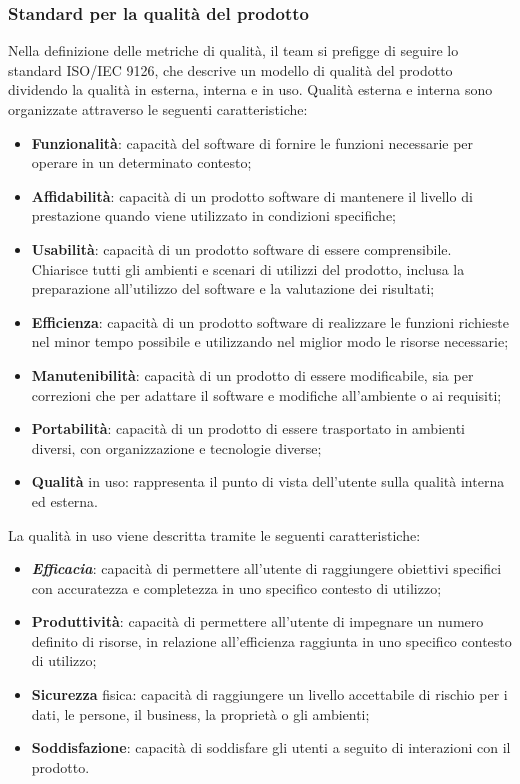 \documentclass[10pt, a4paper]{article}
\begin{document}
\subsubsection{Standard per la qualità del prodotto}
Nella definizione delle metriche di qualità, il team si prefigge di seguire lo standard ISO/IEC 9126, che descrive un modello di qualità del prodotto
dividendo la qualità in esterna, interna e in uso.
Qualità esterna e interna sono organizzate attraverso le seguenti caratteristiche:
\begin{itemize}
    \item \textbf{Funzionalità}: capacità del software di fornire le funzioni necessarie per operare in un determinato contesto;
    \item \textbf{Affidabilità}: capacità di un prodotto software di mantenere il livello di prestazione quando viene utilizzato in condizioni specifiche;
    \item \textbf{Usabilità}: capacità di un prodotto software di essere comprensibile. Chiarisce tutti gli ambienti e scenari di utilizzi del prodotto, 
        inclusa la preparazione all'utilizzo del software e la valutazione dei risultati;
    \item \textbf{Efficienza}: capacità di un prodotto software di realizzare le funzioni richieste nel minor tempo possibile e utilizzando nel miglior modo le risorse necessarie;
    \item \textbf{Manutenibilità}: capacità di un prodotto di essere modificabile, sia per correzioni che per adattare il software e modifiche all'ambiente o ai requisiti;
    \item \textbf{Portabilità}: capacità di un prodotto di essere trasportato in ambienti diversi, con organizzazione e tecnologie diverse;
    \item \textbf{Qualità} in uso: rappresenta il punto di vista dell'utente sulla qualità interna ed esterna. 
\end{itemize}

La qualità in uso viene descritta tramite le seguenti caratteristiche:
\begin{itemize}
    \item \textbf{\textit{Efficacia\pg}}: capacità di permettere all'utente di raggiungere obiettivi specifici con accuratezza e completezza in uno specifico contesto di utilizzo;
    \item \textbf{Produttività}: capacità di permettere all'utente di impegnare un numero definito di risorse, in relazione all'efficienza raggiunta in uno specifico contesto di utilizzo;
    \item \textbf{Sicurezza} fisica: capacità di raggiungere un livello accettabile di rischio per i dati, le persone, il business, la proprietà o gli ambienti;
    \item \textbf{Soddisfazione}: capacità di soddisfare gli utenti a seguito di interazioni con il prodotto. 
\end{itemize}
\end{document}
